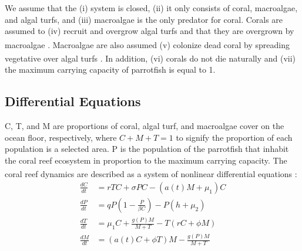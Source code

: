 \documentclass[12pt]{article}
\begin{document}
We assume that the (i) system is closed, (ii) it only consists of coral, macroalgae, and algal turfs, and (iii) macroalgae is the only predator for coral. Corals are assumed to (iv) recruit and overgrow algal turfs and that they are overgrown by macroalgae \textsuperscript{\cite{04_mathanalysis}}. Macroalgae are also assumed (v) colonize dead coral by spreading vegetative over algal turfs \textsuperscript{\cite{04_mathanalysis}}. In addition, (vi) corals do not die naturally and (vii) the maximum carrying capacity of parrotfish is equal to 1.


\subsection{Differential Equations}
C, T, and M are proportions of coral, algal turf, and macroalgae cover on the ocean floor, respectively,  where $C+M+T=1$ to signify the proportion of each population is a selected area. P is the population of the parrotfish that inhabit the coral reef ecosystem in proportion to the maximum carrying capacity. The coral reef dynamics are described as a system of nonlinear differential equations \textsuperscript{\cite{13_blackwood_hastings_mumby_2010}}: 
\begin{align*}
    \frac{dC}{dt} &= rTC + \sigma P C- (a(t)M+\mu_{1})C \label{eq:dCdt}\\
    \frac{dP}{dt} &= qP \left( 1-\frac{P}{\beta C} \right) - P \left( h+\mu_{2} \right) \label{eq:dPdt}\\
    \frac{dT}{dt} &= \mu_{1}C + \frac{g(P)M}{M+T} - T(rC+\phi M) \label{eq:dTdt}\\
    \frac{dM}{dt} &= (a(t)C+ \phi T)M - \frac{g(P)M}{M+T} \label{eq:dMdt}
\end{align*}
\end{document}
